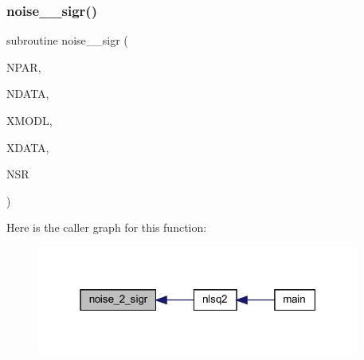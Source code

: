 \subsubsection{\texorpdfstring{noise\+\_\+\_\+sigr()}{noise\_2\_sigr()}}
{\footnotesize\ttfamily subroutine noise\+\_\+\_\+sigr (\begin{DoxyParamCaption}\item[{integer, intent(in)}]{N\+P\+AR,  }\item[{integer, intent(in)}]{N\+D\+A\+TA,  }\item[{real, dimension(ndata), intent(in)}]{X\+M\+O\+DL,  }\item[{real, dimension(ndata), intent(in)}]{X\+D\+A\+TA,  }\item[{real, intent(out)}]{N\+SR }\end{DoxyParamCaption})}

Here is the caller graph for this function\+:\nopagebreak
\begin{figure}[H]
\begin{center}
\leavevmode
\includegraphics[width=301pt]{Leroi_8f90_aa11bf987208a116957b481b3765c8eaf_icgraph}
\end{center}
\end{figure}
\mbox{\label{Leroi_8f90_ae4548433d1a40c9ae5dce4d7404c9404}} 
